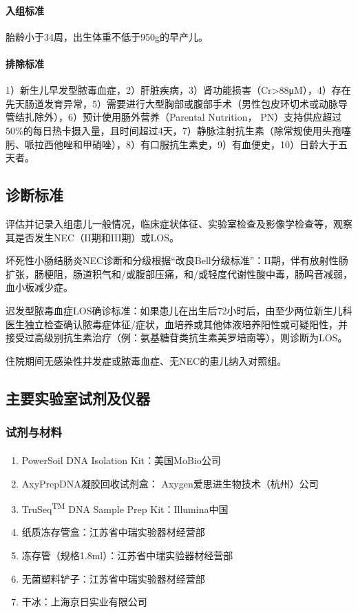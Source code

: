       \paragraph{入组标准}
      胎龄小于34周，出生体重不低于950g的早产儿。
      \paragraph{排除标准}
      1）新生儿早发型脓毒血症，2）肝脏疾病，3）肾功能损害（Cr>88μM），4）存在先天肠道发育异常，5）需要进行大型胸部或腹部手术（男性包皮环切术或动脉导管结扎除外），6）预计使用肠外营养（Parental Nutrition， PN）支持供应超过50\%的每日热卡摄入量，且时间超过4天，7）静脉注射抗生素（除常规使用头孢噻肟、哌拉西他唑和甲硝唑），8）有口服抗生素史，9）有血便史，10）日龄大于五天者。
  \subsection{诊断标准}
  评估并记录入组患儿一般情况，临床症状体征、实验室检查及影像学检查等，观察其是否发生NEC（II期和III期）或LOS。

  坏死性小肠结肠炎NEC诊断和分级根据“改良Bell分级标准”\cite{bell1978neonatal}：II期，伴有放射性肠扩张，肠梗阻，肠道积气和/或腹部压痛，和/或轻度代谢性酸中毒，肠鸣音减弱，血小板减少症。

  迟发型脓毒血症LOS确诊标准：如果患儿在出生后72小时后，由至少两位新生儿科医生独立检查确认脓毒症体征/症状，血培养或其他体液培养阳性或可疑阳性，并接受过高级别抗生素治疗（例：氨基糖苷类抗生素美罗培南等），则诊断为LOS。

  住院期间无感染性并发症或脓毒血症、无NEC的患儿纳入对照组。

  \subsection{主要实验室试剂及仪器}
  \label{主要实验室试剂及仪器}
    \subsubsection{试剂与材料}
    \begin{enumerate}
      \item PowerSoil\textsuperscript{\textregistered} DNA Isolation Kit：美国MoBio公司
      \item AxyPrepDNA凝胶回收试剂盒： Axygen爱思进生物技术（杭州）公司
      \item TruSeq\textsuperscript{TM} DNA Sample Prep Kit：Illumina中国
      \item 纸质冻存管盒：江苏省中瑞实验器材经营部
      \item 冻存管（规格1.8ml）：江苏省中瑞实验器材经营部
      \item 无菌塑料铲子：江苏省中瑞实验器材经营部
      \item 干冰：上海京日实业有限公司
    \end{enumerate}

